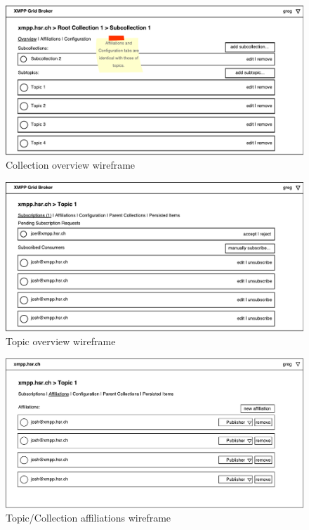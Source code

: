 \begin{figure}[h]
    \centering
    \includegraphics[width=1\linewidth]{resources/wireframe_7}
    \caption{Collection overview wireframe}
\end{figure}

\begin{figure}[h]
    \centering
    \includegraphics[width=1\linewidth]{resources/wireframe_8}
    \caption{Topic overview wireframe}
\end{figure}

\begin{figure}[h]
    \centering
    \includegraphics[width=1\linewidth]{resources/wireframe_9}
    \caption{Topic/Collection affiliations wireframe}
\end{figure}

